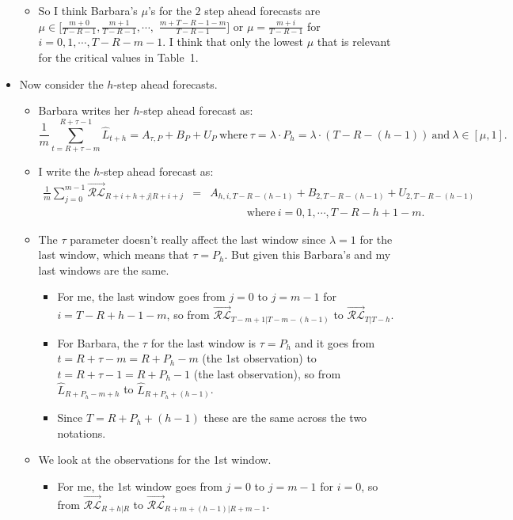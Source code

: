 \documentclass[11pt]{article}
\begin{document}
\begin{itemize}
\begin{itemize}
\begin{itemize}
\end{itemize}
\item So I think Barbara's $\mu$'s for the $2$ step ahead forecasts are $\mu\in [\frac{m+0}{T-R-1},\frac{m+1}{T-R-1},\cdots,$ $\frac{m+T-R-1-m}{T-R-1}]$ or $\mu=\frac{m+i}{T-R-1}$ for $i=0,1,\cdots,T-R-m-1$.  I think that only
the lowest $\mu$ that is relevant for the critical values in Table~1.
\end{itemize}
\item Now consider the $h$-step ahead forecasts.
\begin{itemize}
\item Barbara writes her $h$-step ahead forecast as: 
\[
\frac{1}{m}\sum_{t=R+\tau-m}^{R+\tau-1}\widehat{L}_{t+h}=A_{\tau,P}\!+\!B_{P}\!+\!U_{P} \ \mathrm{where} \  \tau=\lambda\cdot P_{h}=\lambda\cdot(T-R-(h-1)) \ \mathrm{and} \  \lambda\in[\mu,1].\]
\item I write the $h$-step ahead forecast as: 
\begin{eqnarray}
\frac{1}{m}\sum_{j=0}^{m-1}  \overrightarrow{\mathcal{RL}}_{R+i+h+j|R+i+j}
\!\!\!\!&=&\!\!\!\!A_{h,i,T-R-(h-1)}+B_{2,T-R-(h-1)}+U_{2,T-R-(h-1)} \nonumber \\
&&\ \ \ \ \   \ \ \ \ \   \ \ \ \ \   \mathrm{where}\  i=0,1,\cdots,T-R-h+1-m. \nonumber
\end{eqnarray}
\item The $\tau$ parameter doesn't really affect the last window since $\lambda=1$ for the last window, which means that $\tau=P_{h}$. But given this Barbara's and my last windows are the same.
\begin{itemize}
\item For me, the last window goes from $j=0$ to $j=m-1$ for $i=T-R+h-1-m$, so from $\overrightarrow{\mathcal{RL}}_{T-m+1|T-m-(h-1)}$ to $\overrightarrow{\mathcal{RL}}_{T|T-h}$.
\item For Barbara, the $\tau$ for the last window is $\tau=P_{h}$ and it goes from $t=R+\tau-m=R+P_{h}-m$ (the 1st observation) to $t=R+\tau-1=R+P_{h}-1$ (the last observation), so from $\widehat{L}_{R+P_{h}-m+h}$ to $\widehat{L}_{R+P_{h}+(h-1)}$. 
\item Since $T=R+P_{h}+(h-1)$ these are the same across the two notations.
\end{itemize}
\item We look at the observations for the 1st window.
\begin{itemize}
\item For me, the 1st window goes from $j=0$ to $j=m-1$ for $i=0$, so from $\overrightarrow{\mathcal{RL}}_{R+h|R}$ to $\overrightarrow{\mathcal{RL}}_{R+m+(h-1)|R+m-1}$.

\end{itemize}
\end{itemize}
\end{itemize}
\end{document}
